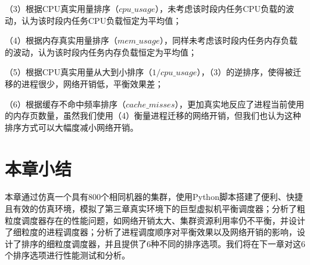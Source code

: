 （3）根据CPU真实用量排序（$cpu\_usage$），未考虑该时段内任务CPU负载的波动，认为该时段内任务CPU负载恒定为平均值；

（4）根据内存真实用量排序（$mem\_usage$），同样未考虑该时段内任务内存负载的波动，认为该时段内任务内存负载恒定为平均值；

（5）根据CPU真实用量从大到小排序（$1/cpu\_usage$），（3）的逆排序，使得被迁移的进程很少，网络开销低，平衡效果差；

（6）根据缓存不命中频率排序（$cache\_misses$），更加真实地反应了进程当前使用的内存页数量，虽然我们使用（4）衡量进程迁移的网络开销，但我们也认为这种排序方式可以大幅度减小网络开销。


\section{本章小结}
本章通过仿真一个具有800个相同机器的集群，使用Python脚本搭建了便利、快捷且有效的仿真环境，模拟了第三章真实环境下的巨型虚拟机平衡调度器；分析了粗粒度调度器存在的性能问题，如网络开销太大、集群资源利用率仍不平衡，并设计了细粒度的进程调度器；分析了进程调度顺序对平衡效果以及网络开销的影响，设计了排序的细粒度调度器，并且提供了6种不同的排序选项。我们将在下一章对这6个排序选项进行性能测试和分析。